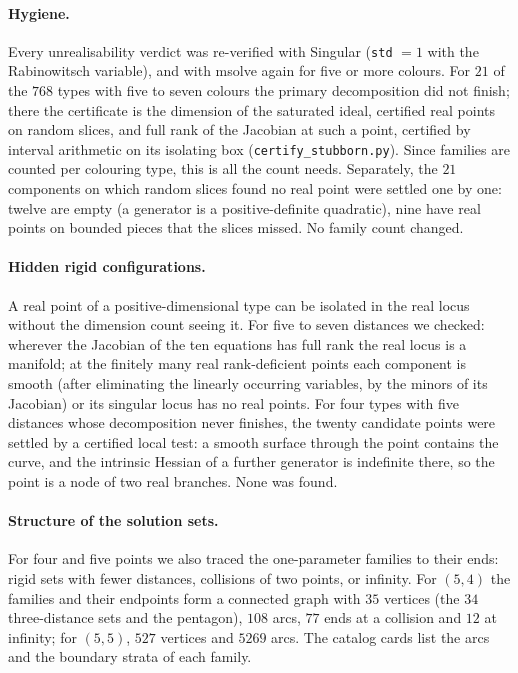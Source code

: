 \documentclass[11pt]{amsart}
\theoremstyle{remark}
\begin{document}
\paragraph{Hygiene.} Every unrealisability verdict was re-verified with Singular (\texttt{std} $=1$ with the
Rabinowitsch variable), and with msolve again for five or more colours. For $21$ of the $768$ types with five to seven colours the primary
decomposition did not finish; there the certificate is the dimension of the saturated ideal, certified
real points on random slices, and full rank of the Jacobian at such a point, certified by interval arithmetic on
its isolating box (\texttt{certify\_stubborn.py}). Since families are counted per colouring type, this is all
the count needs. Separately, the $21$ components
on which random slices found no real point were settled one by one: twelve are empty (a generator is a
positive-definite quadratic), nine have real points on bounded pieces that the slices missed. No family
count changed.

\paragraph{Hidden rigid configurations.} A real point of a positive-dimensional type can be isolated in the
real locus without the dimension count seeing it. For five to seven distances we checked: wherever the
Jacobian of the ten equations has full rank the real locus is a manifold; at the finitely many real
rank-deficient points each component is smooth (after eliminating the linearly occurring variables, by
the minors of its Jacobian) or its singular locus has no real points. For four types with five distances
whose decomposition never finishes, the twenty candidate points were settled by a certified local test: a
smooth surface through the point contains the curve, and the intrinsic Hessian of a further generator is
indefinite there, so the point is a node of two real branches. None was found.

\paragraph{Structure of the solution sets.} For four and five points we also traced the one-parameter
families to their ends: rigid sets with fewer distances, collisions of two points, or infinity. For $(5,4)$
the families and their endpoints form a connected graph with $35$ vertices (the $34$ three-distance sets and
the pentagon), $108$ arcs, $77$ ends at a collision and $12$ at infinity; for $(5,5)$, $527$ vertices and
$5269$ arcs. The catalog cards list the arcs and the boundary strata of each family.
\end{document}
